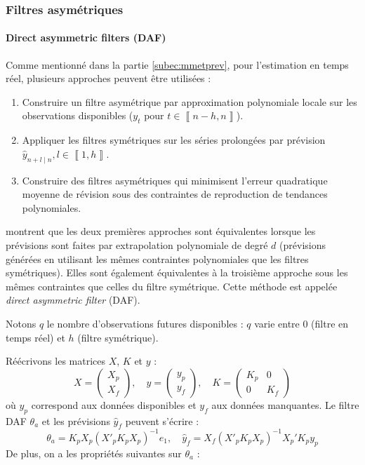 \documentclass[
  11pt,
  french,
  a4paper]{article}
\newcommand\1{\mathds{1}}
\begin{document}
\hypertarget{filtres-asymuxe9triques}{%
\subsubsection{Filtres asymétriques}\label{filtres-asymuxe9triques}}

\hypertarget{direct-asymmetric-filters-daf}{%
\paragraph{Direct asymmetric filters (DAF)}\label{direct-asymmetric-filters-daf}}

Comme mentionné dans la partie \ref{subec:mmetprev}, pour l'estimation en temps réel, plusieurs approches peuvent être utilisées :

\begin{enumerate}
\def\labelenumi{\arabic{enumi}.}
\item
  Construire un filtre asymétrique par approximation polynomiale locale sur les observations disponibles (\(y_{t}\) pour \(t\in\left\llbracket n-h,n\right\rrbracket\)).
\item
  Appliquer les filtres symétriques sur les séries prolongées par prévision \(\hat{y}_{n+l\mid n},l\in\left\llbracket 1,h\right\rrbracket\).
\item
  Construire des filtres asymétriques qui minimisent l'erreur quadratique moyenne de révision sous des contraintes de reproduction de tendances polynomiales.
\end{enumerate}

\textcite{proietti2008} montrent que les deux premières approches sont équivalentes lorsque les prévisions sont faites par extrapolation polynomiale de degré \(d\) (prévisions générées en utilisant les mêmes contraintes polynomiales que les filtres symétriques).
Elles sont également équivalentes à la troisième approche sous les mêmes contraintes que celles du filtre symétrique.
Cette méthode est appelée \emph{direct asymmetric filter} (DAF).

Notons \(q\) le nombre d'observations futures disponibles : \(q\) varie entre 0 (filtre en temps réel) et \(h\) (filtre symétrique).

Réécrivons les matrices \(X\), \(K\) et \(y\) :
\[
X=\begin{pmatrix}X_{p}\\
X_{f}
\end{pmatrix},\quad y=\begin{pmatrix}y_{p}\\
y_{f}
\end{pmatrix},\quad K=\begin{pmatrix}K_{p} & 0\\
0 & K_{f}
\end{pmatrix}
\]
où \(y_{p}\) correspond aux données disponibles et \(y_{f}\) aux données manquantes.
Le filtre DAF \(\theta_{a}\) et les prévisions \(\hat{y}_{f}\) peuvent s'écrire :
\[
\theta_{a}=K_{p}X_{p}(X'_{p}K_{p}X_{p})^{-1}e_{1},
\quad
\hat{y}_{f}=X_{f}(X'_{p}K_{p}X_{p})^{-1}X_{p}'K_{p}y_{p}
\]
De plus, on a les propriétés suivantes sur \(\theta_{a}\) :
\end{document}
